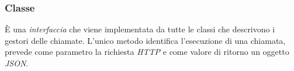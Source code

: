 \documentclass[tesi.tex]{subfiles}
\begin{document}
\subsubsection{Classe }
\begin{center}
\end{center}
\`E una \emph{interfaccia} che viene implementata da tutte le classi
che descrivono i gestori delle chiamate. L'unico metodo 
identifica l'esecuzione di una chiamata, prevede come parametro la
richiesta \emph{HTTP} e come valore di ritorno un oggetto
\emph{JSON}.
\end{document}
